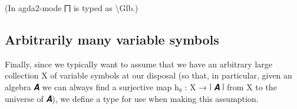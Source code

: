 \documentclass[sigplan,screen]{acmart}
\begin{document}
(In agda2-mode ⨅ is typed as \textbackslash Glb.)

\subsection{Arbitrarily many variable symbols}

Finally, since we typically want to assume that we have an arbitrary large collection X of variable symbols at our disposal (so that, in particular, given an algebra 𝑨 we can always find a surjective map h₀ : X → ∣ 𝑨 ∣ from X to the universe of 𝑨), we define a type for use when making this assumption.

\begin{code}%
%
\>[1]\AgdaSpace{}%
\AgdaSymbol{:}\AgdaSpace{}%
\AgdaSpace{}%
\AgdaSpace{}%
\AgdaSpace{}%
\AgdaSpace{}%
\AgdaSpace{}%
\AgdaSpace{}%
\AgdaSpace{}%
\AgdaSpace{}%
\AgdaSpace{}%
\AgdaSpace{}%
\<%
\\
%
\>[1]\AgdaSpace{}%
\AgdaSpace{}%
\AgdaSpace{}%
\AgdaSymbol{=}\AgdaSpace{}%
\AgdaSpace{}%
\AgdaSpace{}%
\AgdaSpace{}%
\AgdaSymbol{(}\AgdaSpace{}%
\AgdaSpace{}%
\AgdaSpace{}%
\AgdaSpace{}%
\AgdaSymbol{)}\AgdaSpace{}%
\AgdaFunction{,}\AgdaSpace{}%
\AgdaSpace{}%
\<%
\end{code}
\end{document}
